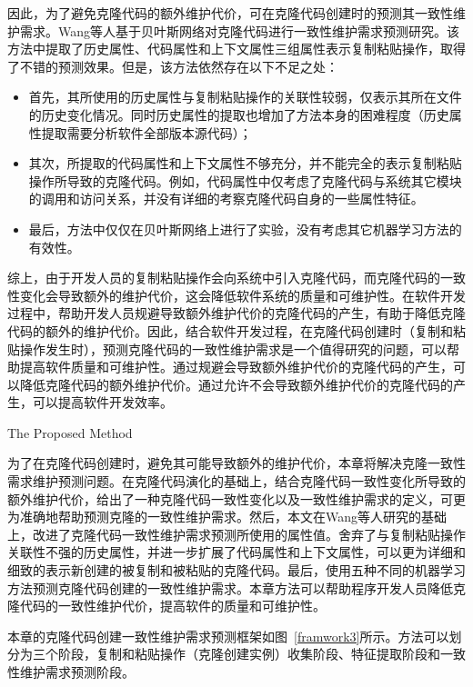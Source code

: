 因此，为了避免克隆代码的额外维护代价，可在克隆代码创建时的预测其一致性维护需求。Wang等人基于贝叶斯网络对克隆代码进行一致性维护需求预测研究\cite{wang2014predicting}。该方法中提取了历史属性、代码属性和上下文属性三组属性表示复制粘贴操作，取得了不错的预测效果。但是，该方法依然存在以下不足之处：

\begin{itemize}
\item
首先，其所使用的历史属性与复制粘贴操作的关联性较弱，仅表示其所在文件的历史变化情况。同时历史属性的提取也增加了方法本身的困难程度（历史属性提取需要分析软件全部版本源代码）；
\item
其次，所提取的代码属性和上下文属性不够充分，并不能完全的表示复制粘贴操作所导致的克隆代码。例如，代码属性中仅考虑了克隆代码与系统其它模块的调用和访问关系，并没有详细的考察克隆代码自身的一些属性特征。
\item
最后，方法中仅仅在贝叶斯网络上进行了实验，没有考虑其它机器学习方法的有效性。
\end{itemize}

综上，由于开发人员的复制粘贴操作会向系统中引入克隆代码，而克隆代码的一致性变化会导致额外的维护代价，这会降低软件系统的质量和可维护性。在软件开发过程中，帮助开发人员规避导致额外维护代价的克隆代码的产生，有助于降低克隆代码的额外的维护代价。因此，结合软件开发过程，在克隆代码创建时（复制和粘贴操作发生时），预测克隆代码的一致性维护需求是一个值得研究的问题，可以帮助提高软件质量和可维护性。通过规避会导致额外维护代价的克隆代码的产生，可以降低克隆代码的额外维护代价。通过允许不会导致额外维护代价的克隆代码的产生，可以提高软件开发效率。

{The Proposed Method}

为了在克隆代码创建时，避免其可能导致额外的维护代价，本章将解决克隆一致性需求维护预测问题。在克隆代码演化的基础上，结合克隆代码一致性变化所导致的额外维护代价，给出了一种克隆代码一致性变化以及一致性维护需求的定义，可更为准确地帮助预测克隆的一致性维护需求。然后，本文在Wang等人研究的基础上，改进了克隆代码一致性维护需求预测所使用的属性值。舍弃了与复制粘贴操作关联性不强的历史属性，并进一步扩展了代码属性和上下文属性，可以更为详细和细致的表示新创建的被复制和被粘贴的克隆代码。最后，使用五种不同的机器学习方法预测克隆代码创建的一致性维护需求。本章方法可以帮助程序开发人员降低克隆代码的一致性维护代价，提高软件的质量和可维护性。

本章的克隆代码创建一致性维护需求预测框架如图~\ref{framwork3}所示。方法可以划分为三个阶段，复制和粘贴操作（克隆创建实例）收集阶段、特征提取阶段和一致性维护需求预测阶段。

